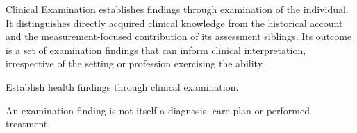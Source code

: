 Clinical Examination establishes findings through examination of the individual. It distinguishes directly acquired clinical knowledge from the historical account and the measurement-focused contribution of its assessment siblings. Its outcome is a set of examination findings that can inform clinical interpretation, irrespective of the setting or profession exercising the ability.



Establish health findings through clinical examination.



An examination finding is not itself a diagnosis, care plan or performed treatment.


